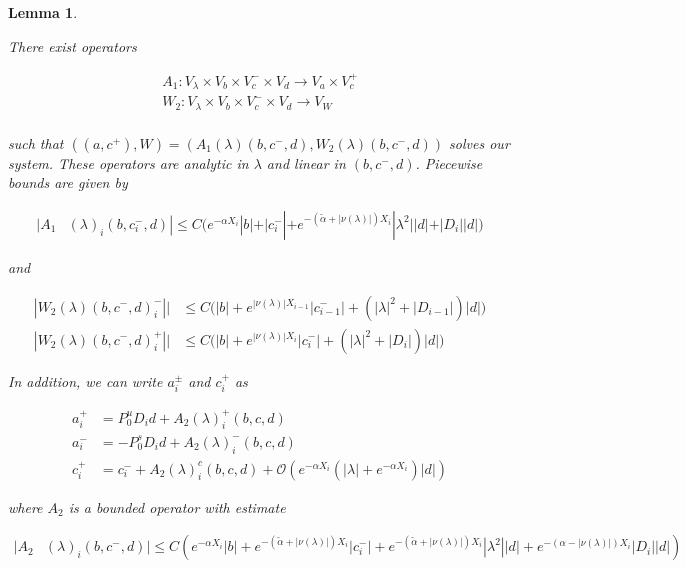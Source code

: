 \documentclass[12pt]{article}
\newtheorem{lemma}{Lemma}
\begin{document}
\begin{lemma}\label{inv2}

There exist operators

\begin{align*}
A_1: V_\lambda \times V_b \times V_c^- \times V_d \rightarrow V_a \times V_c^+\\
W_2: V_\lambda \times V_b \times V_c^- \times V_d \rightarrow V_W \\
\end{align*}

such that $( (a, c^+) ,W) = ( A_1(\lambda)(b,c^-,d), W_2(\lambda)(b,c^-,d) )$ solves our system. These operators are analytic in $\lambda$ and linear in $(b,c^-,d)$. Piecewise bounds are given by

\begin{align}\label{A1bound}
|A_1&(\lambda)_i(b, c_i^-, d)|
\leq C \Big( e^{-\alpha X_i} |b| + |c_i^-| + e^{-(\tilde{\alpha}+|\nu(\lambda)|) X_i} |\lambda^2| |d| + |D_i||d| \Big)
\end{align} 

and

\begin{align}
|W_2(\lambda)(b,c^-,d)_i^-|| &\leq C \Big( |b| + e^{|\nu(\lambda)|X_{i-1}}|c_{i-1}^-| + (|\lambda|^2 + |D_{i-1}|)|d| \Big) \\
|W_2(\lambda)(b,c^-,d)_i^+|| 
&\leq C \Big( |b| + e^{|\nu(\lambda)|X_i}|c_i^-| + (|\lambda|^2 + |D_i|)|d| \Big)
\end{align}

In addition, we can write $a_i^\pm$ and $c_i^+$ as 

\begin{align*}
a_i^+ &= P^u_0 D_i d + A_2(\lambda)_i^+(b, c, d) \\
a_i^- &= -P^s_0 D_i d + A_2(\lambda)_i^-(b, c, d) \\
c_i^+ &= c_i^- + A_2(\lambda)_i^c(b, c, d) + \mathcal{O}( e^{-\alpha X_i} \left( |\lambda| +  e^{-\alpha X_i}  \right) |d| )
\end{align*}

where $A_2$ is a bounded operator with estimate

\begin{align*}
|A_2&(\lambda)_i(b, c^-, d)| \leq C ( e^{-\alpha X_i} |b| + e^{-(\tilde{\alpha} + |\nu(\lambda)|)X_i} |c_i^-| 
+ e^{-(\tilde{\alpha} + |\nu(\lambda)|) X_i} |\lambda^2| |d| + e^{-(\alpha - |\nu(\lambda)|) X_i}|D_i||d| ) \\
\end{align*}


\end{lemma}
\end{document}
